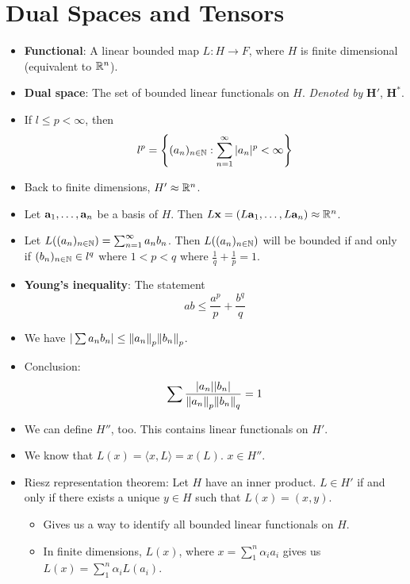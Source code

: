 \documentclass[../../notes.tex]{subfiles}
\begin{document}
\chapter{Dual Spaces and Tensors}
\begin{itemize}
    \item {}\textbf{Functional}: A linear bounded map $L:H\to F$, where $H$ is finite dimensional (equivalent to $\mathbb{R}^n$).
    \item \textbf{Dual space}: The set of bounded linear functionals on $H$. \emph{Denoted by} $\bm{H'}$, $\bm{H^*}$.
    \item If $l\leq p<\infty$, then
    \begin{equation*}
        l^p = \left\{ (a_n)_{n\in\mathbb{N}}:\sum_{n=1}^\infty|a_n|^p<\infty \right\}
    \end{equation*}
    \item Back to finite dimensions, $H'\approx\mathbb{R}^n$.
    \item Let $\mathbf{a}_1,\dots,\mathbf{a}_n$ be a basis of $H$. Then $L\mathbf{x}=(L\mathbf{a}_1,\dots,L\mathbf{a}_n)\approx\mathbb{R}^n$.
    \item Let $L((a_n)_{n\in\mathbb{N}})=\sum_{n=1}^\infty a_nb_n$. Then $L((a_n)_{n\in\mathbb{N}})$ will be bounded if and only if $(b_n)_{n\in\mathbb{N}}\in l^q$ where $1<p<q$ where $\frac{1}{q}+\frac{1}{p}=1$.
    \item \textbf{Young's inequality}: The statement
    \begin{equation*}
        ab \leq \frac{a^p}{p}+\frac{b^q}{q}
    \end{equation*}
    \item We have $|\sum a_nb_n|\leq\norm{a_n}_p\norm{b_n}_p$.
    \item Conclusion:
    \begin{equation*}
        \sum\frac{|a_n||b_n|}{\norm{a_n}_p\norm{b_n}_q} = 1
    \end{equation*}
    \item We can define $H''$, too. This contains linear functionals on $H'$.
    \item We know that $L(x)=\langle x,L\rangle=x(L)$. $x\in H''$.
    \item Riesz representation theorem: Let $H$ have an inner product. $L\in H'$ if and only if there exists a unique $y\in H$ such that $L(x)=(x,y)$.
    \begin{itemize}
        \item Gives us a way to identify all bounded linear functionals on $H$.
        \item In finite dimensions, $L(x)$, where $x=\sum_1^n\alpha_ia_i$ gives us $L(x)=\sum_1^n\alpha_iL(a_i)$.
    \end{itemize}
\end{itemize}
\end{document}

